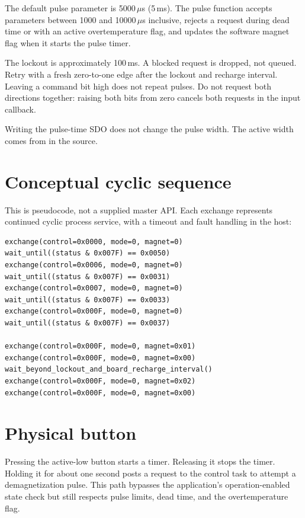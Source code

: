 \documentclass[10pt,a4paper,oneside]{report}
\newcommand{\code}[1]{\texttt{\detokenize{#1}}}
\begin{document}
The default pulse parameter is 5000\,$\mu$s (5\,ms). The pulse function
accepts parameters between 1000 and 10000\,$\mu$s inclusive, rejects a
request during dead time or with an active overtemperature flag, and
updates the software magnet flag when it starts the pulse timer.

The lockout is approximately 100\,ms. A blocked request is dropped,
not queued. Retry with a fresh zero-to-one edge after the lockout and
recharge interval. Leaving a command bit high does not repeat pulses.
Do not request both directions together: raising both bits from zero
cancels both requests in the input callback.

Writing the pulse-time SDO does not change the pulse width. The active
width comes from \code{MAGNETIZATION_TIME} in the source.

\section{Conceptual cyclic sequence}

This is pseudocode, not a supplied master API. Each exchange represents
continued cyclic process service, with a timeout and fault handling in
the host:

\begin{verbatim}
exchange(control=0x0000, mode=0, magnet=0)
wait_until((status & 0x007F) == 0x0050)
exchange(control=0x0006, mode=0, magnet=0)
wait_until((status & 0x007F) == 0x0031)
exchange(control=0x0007, mode=0, magnet=0)
wait_until((status & 0x007F) == 0x0033)
exchange(control=0x000F, mode=0, magnet=0)
wait_until((status & 0x007F) == 0x0037)

exchange(control=0x000F, mode=0, magnet=0x01)
exchange(control=0x000F, mode=0, magnet=0x00)
wait_beyond_lockout_and_board_recharge_interval()
exchange(control=0x000F, mode=0, magnet=0x02)
exchange(control=0x000F, mode=0, magnet=0x00)
\end{verbatim}

\section{Physical button}

Pressing the active-low button starts a timer. Releasing it stops the
timer. Holding it for about one second posts a request to the control task
to attempt a demagnetization pulse. This path bypasses the application's
operation-enabled state check but still respects pulse limits, dead
time, and the overtemperature flag.
\end{document}

